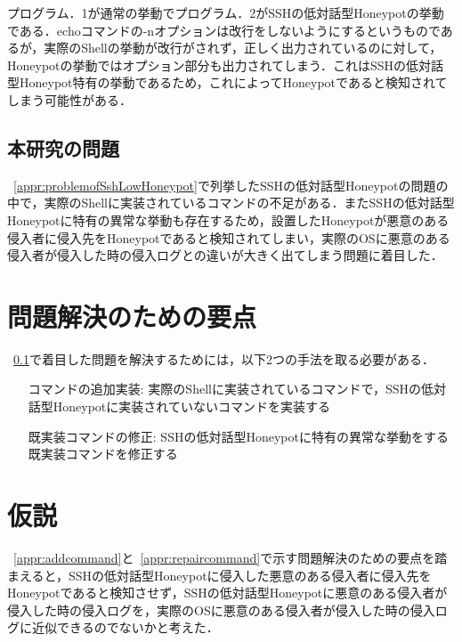 プログラム．1が通常の挙動でプログラム．2がSSHの低対話型Honeypotの挙動である．echoコマンドの-nオプションは改行をしないようにするというものであるが，実際のShellの挙動が改行がされず，正しく出力されているのに対して，Honeypotの挙動ではオプション部分も出力されてしまう．これはSSHの低対話型Honeypot特有の挙動であるため，これによってHoneypotであると検知されてしまう可能性がある．


\subsection{本研究の問題}
\label{appr:subproblem}
~\ref{appr:problemofSshLowHoneypot}で列挙したSSHの低対話型Honeypotの問題の中で，実際のShellに実装されているコマンドの不足がある．またSSHの低対話型Honeypotに特有の異常な挙動も存在するため，設置したHoneypotが悪意のある侵入者に侵入先をHoneypotであると検知されてしまい，実際のOSに悪意のある侵入者が侵入した時の侵入ログとの違いが大きく出てしまう問題に着目した．

\section{問題解決のための要点}
\label{appr:YotenForProblem}
~\ref{appr:subproblem}で着目した問題を解決するためには，以下2つの手法を取る必要がある．

\begin{itemize}
\setlength{\leftskip}{3．2cm}
 \item[コマンドの追加実装:] 実際のShellに実装されているコマンドで，SSHの低対話型Honeypotに実装されていないコマンドを実装する
 \item[既実装コマンドの修正:] SSHの低対話型Honeypotに特有の異常な挙動をする既実装コマンドを修正する
\end{itemize}


\section{仮説}
\label{appr:Hypothesis}
~\ref{appr:addcommand}と~\ref{appr:repaircommand}で示す問題解決のための要点を踏まえると，SSHの低対話型Honeypotに侵入した悪意のある侵入者に侵入先をHoneypotであると検知させず，SSHの低対話型Honeypotに悪意のある侵入者が侵入した時の侵入ログを，実際のOSに悪意のある侵入者が侵入した時の侵入ログに近似できるのでないかと考えた．

